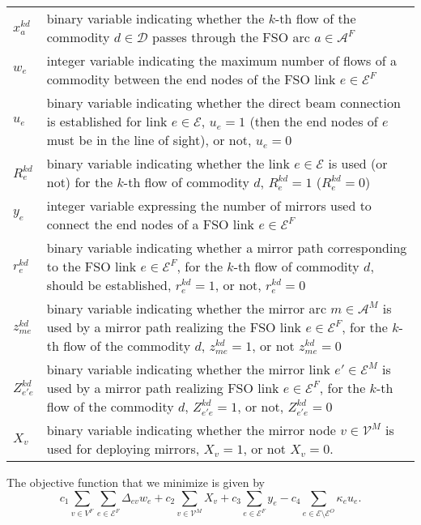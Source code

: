 \documentclass[onecolumn,11pt,draftclsnofoot]{IEEEtran}
\begin{document}
\begin{tabular}{lp{16cm}}
$x_{a}^{kd}$ & binary variable indicating whether the $k$-th flow  of the commodity $d \in \mathcal D$ passes through the FSO arc $a \in \mathcal A^F$\\
$w_e$ & integer variable indicating the maximum number of flows of a commodity between the end nodes of the FSO link $e \in \mathcal E^F$\\
$u_e$ & binary variable indicating whether the direct beam connection is established for link $e \in \mathcal E$, $u_e=1$ (then the end nodes of $e$ must be in the line of sight), or not, $u_e=0$\\
$R_{e}^{kd}$ & binary variable indicating whether the link $e \in \mathcal E$ is used (or not) for the $k$-th flow of commodity $d$, $R_{e}^{kd}=1$ ($R_{e}^{kd}=0$)\\
$y_e$ &  integer variable expressing the number of mirrors used to connect the end nodes of a FSO link $e \in \mathcal E^F$\\
$r_{e}^{kd}$ &  binary variable indicating whether a mirror path corresponding to the FSO link $e \in \mathcal E^F$, for the $k$-th flow of commodity $d$, should be established, $r_{e}^{kd}=1$, or not, $r_{e}^{kd}=0$ \\
$z_{me}^{kd}$ & binary variable indicating whether the mirror arc $m \in \mathcal A^M$  is used by a mirror path realizing the FSO link $e \in \mathcal E^F$, for the $k$-th flow of the commodity $d$, $z_{me}^{kd}=1$, or not $z_{me}^{kd}=0$\\
$Z_{e'e}^{kd}$ & binary variable indicating whether the mirror link $e'\in \mathcal E^M$ is used by a mirror path realizing FSO link $e \in \mathcal E^F$, for the $k$-th flow of the commodity $d$, $Z_{e'e}^{kd}=1$,  or not, $Z_{e'e}^{kd}=0$ \\
$X_v$ &  binary variable indicating whether the mirror node $v \in \mathcal V^M$ is used for deploying mirrors, $X_v=1$, or not $X_v=0$.
\end{tabular}

The objective function that we minimize is given by
\begin{equation}\label{eq:objective}
c_1 \sum_{v \in V^F} \sum_{e \in  \mathcal E^F}  \Delta_{ev} w_e  + c_2 \sum_{v \in \mathcal V^M} X_v +  c_3  \sum_{e \in \mathcal E^F} y_e  - c_4 \sum_{e \in  \mathcal E \setminus  \mathcal E^O}  \kappa_e u_e.
\end{equation}
\end{document}
